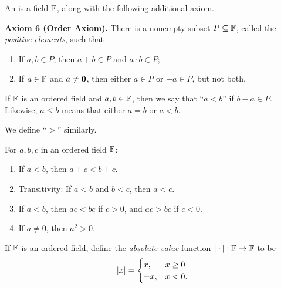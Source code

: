 \documentclass[11pt,twoside=off,numbers=noenddot]{scrbook}
\begin{document}
\begin{definition}
    An  is a field $\mathbb F$, along with the following additional axiom.

    \textbf{Axiom 6 (Order Axiom).} There is a nonempty subset $P \subseteq \mathbb F$, called the \textit{positive elements}, such that
    \begin{enumerate}
        \item If $a, b \in P$, then $a + b \in P$ and $a \cdot b \in P$;
        \item If $a \in \mathbb F$ and $a \neq \textbf{0}$, then either $a \in P$ or $-a \in P$, but not both.
    \end{enumerate}
\end{definition}

\begin{definition}[Inequalities]
    If $\mathbb F$ is an ordered field and $a, b \in \mathbb F$, then we say that ``$a < b$'' if $b - a \in P$. Likewise, $a \leq b$ means that either $a = b$ or $a < b$.

    We define ``$>$'' similarly.
\end{definition}

\begin{fact}
    For $a, b, c$ in an ordered field $\mathbb F$:
    \begin{enumerate}
        \item If $a < b$, then $a + c < b + c$.
        \item Transitivity: If $a < b$ and $b < c$, then $a < c$.
        \item If $a < b$, then $ac < bc$ if $c > 0$, and $ac > bc$ if $c < 0$.
        \item If $a \neq 0$, then $a^2 > 0$.
    \end{enumerate}
\end{fact}

\begin{definition}
    If $\mathbb F$ is an ordered field, define the \textit{absolute value} function $| \cdot | : \mathbb F \to \mathbb F$ to be
    \begin{align*}
        | x | = \begin{cases}
            x, & x \geq 0 \\
            -x, & x < 0.
        \end{cases}
    \end{align*}
\end{definition}
\end{document}
